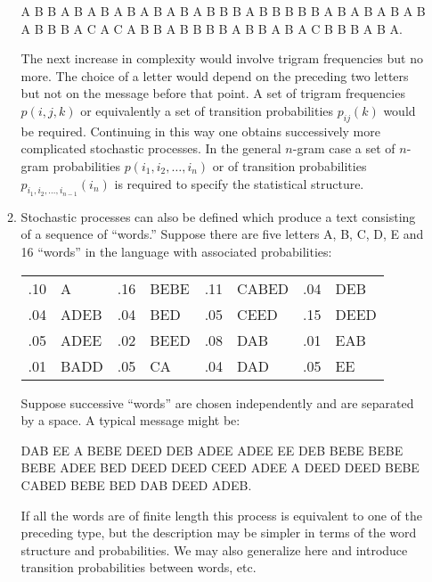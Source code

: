 \begin{enumerate}
\begin{enumerate}
A B B A B A B A B A B A B A B B B A B B B B B A B A B A B A B A B B B A C A C A B B A B B B B A B B A B A C B B B A B A.

The next increase in complexity would involve trigram frequencies but
no more.  The choice of a letter would depend on the preceding two letters
but not on the message before that point.  A set of trigram frequencies
$p(i,j,k)$ or equivalently a set of transition probabilities $p_{ij}(k)$
would be required.  Continuing in this way one obtains successively
more complicated stochastic processes.  In the general $n$-gram case a
set of $n$-gram probabilities $p(i_1,i_2,\dots,i_n)$ or of transition
probabilities $p_{i_1,i_2,\dots,i_{n-1}}(i_n)$ is required
to specify the statistical structure.

\item
Stochastic processes can also be defined which produce a text consisting
of a sequence of ``words.'' Suppose there are five letters A, B, C, D,
E and 16 ``words'' in the language with associated probabilities:
\begin{center}
\begin{tabular}{l@{~}l l@{~}l l@{~}l l@{~}l}
.10 & A & .16 & BEBE & .11 & CABED & .04 & DEB \\
.04 & ADEB & .04 & BED & .05 & CEED & .15 & DEED \\
.05 & ADEE & .02 & BEED & .08 & DAB & .01 & EAB \\
.01 & BADD & .05 & CA & .04 & DAD & .05 & EE
\end{tabular}
\end{center}
Suppose successive ``words'' are chosen independently and are separated by
a space.  A typical message might be:

DAB EE A BEBE DEED DEB ADEE ADEE EE DEB
BEBE BEBE BEBE ADEE BED DEED DEED CEED
ADEE A DEED DEED BEBE CABED BEBE BED DAB
DEED ADEB.

If all the words are of finite length this process is equivalent to one
of the preceding type, but the description may be simpler in terms of
the word structure and probabilities.  We may also generalize here and
introduce transition probabilities between words, etc.
\end{enumerate}
\end{enumerate}

